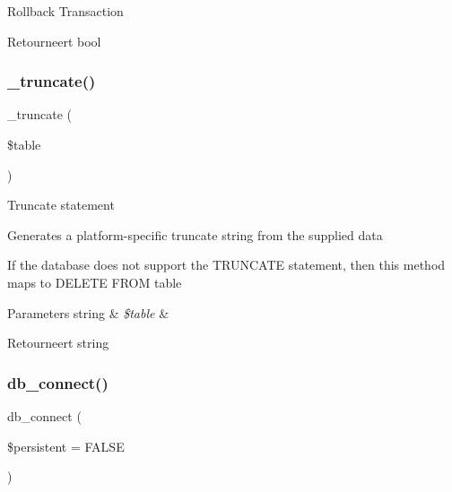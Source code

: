 Rollback Transaction

\begin{DoxyReturn}{Retourneert}
bool 
\end{DoxyReturn}
\mbox{\label{class_c_i___d_b__pdo__mysql__driver_aa029600528fc1ce660a23ff4b4667f95}} 
\subsubsection{\texorpdfstring{\_truncate()}{\_truncate()}}
{\footnotesize\ttfamily \+\_\+truncate (\begin{DoxyParamCaption}\item[{}]{\$table }\end{DoxyParamCaption})\hspace{0.3cm}{\ttfamily [protected]}}

Truncate statement

Generates a platform-\/specific truncate string from the supplied data

If the database does not support the T\+R\+U\+N\+C\+A\+TE statement, then this method maps to \textquotesingle{}D\+E\+L\+E\+TE F\+R\+OM table\textquotesingle{}


\begin{DoxyParams}[1]{Parameters}
string & {\em \$table} & \\
\hline
\end{DoxyParams}
\begin{DoxyReturn}{Retourneert}
string 
\end{DoxyReturn}
\mbox{\label{class_c_i___d_b__pdo__mysql__driver_a52bf595e79e96cc0a7c907a9b45aeb4d}} 
\subsubsection{\texorpdfstring{db\_connect()}{db\_connect()}}
{\footnotesize\ttfamily db\+\_\+connect (\begin{DoxyParamCaption}\item[{}]{\$persistent = {\ttfamily FALSE} }\end{DoxyParamCaption})}


